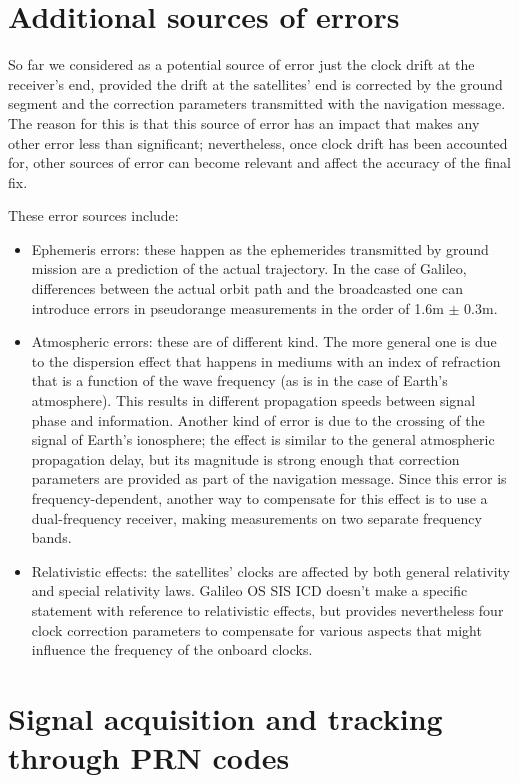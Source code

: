 \section{Additional sources of errors}
So far we considered as a potential source of error just the clock drift at the
receiver's end, provided the drift at the satellites' end is corrected by the
ground segment and the correction parameters transmitted with the navigation
message. The reason for this is that this source of error has an impact that
makes any other error less than significant; nevertheless, once clock drift has
been accounted for, other sources of error can become relevant and affect the
accuracy of the final fix.

These error sources include:
\begin{itemize}
  \item Ephemeris errors: these happen as the ephemerides transmitted by ground
    mission are a prediction of the actual trajectory. In the case of Galileo,
    differences between the actual orbit path and the broadcasted one can
    introduce errors in pseudorange measurements in the order of 1.6m $\pm$
    0.3m.
  \item Atmospheric errors: these are of different kind. The more general one is
    due to the dispersion effect that happens in mediums with an index of
    refraction that is a function of the wave frequency (as is in the case of
    Earth's atmosphere). This results in different propagation speeds between
    signal phase and information. Another kind of error is due to the crossing
    of the signal of Earth's ionosphere; the effect is similar to the general
    atmospheric propagation delay, but its magnitude is strong enough that
    correction parameters are provided as part of the navigation message.
    Since this error is frequency-dependent, another way to compensate for this
    effect is to use a dual-frequency receiver, making measurements on two
    separate frequency bands.
  \item Relativistic effects: the satellites' clocks are affected by both
    general relativity and special relativity laws. Galileo OS SIS ICD doesn't
    make a specific statement with reference to relativistic effects, but
    provides nevertheless four clock correction parameters to compensate for
    various aspects that might influence the frequency of the onboard clocks.
\end{itemize}

\section{Signal acquisition and tracking through PRN codes}
